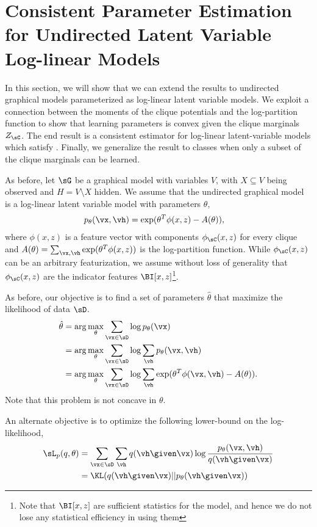 \section{Consistent Parameter Estimation for Undirected Latent Variable Log-linear Models}
\label{sec:undirected}

In this section, we will show that we can extend the results to
  undirected graphical models parameterized as log-linear latent variable
  models.
We exploit a connection between the moments of the clique potentials and
  the log-partition function to show that learning parameters is convex
  given the clique marginals $Z_\sC$. 
The end result is a consistent estimator for log-linear
  latent-variable models which satisfy .
Finally, we generalize the result to classes when only a subset of the
  clique marginals can be learned.

As before, let $\sG$ be a graphical model with variables $V$, with $X
  \subseteq V$ being observed and $H = V \setminus X$ hidden.
We assume that the undirected graphical model is a log-linear latent
  variable model with parameters $\theta$,
\begin{align*}
  p_\theta(\vx, \vh) &= \exp( \theta^T\phi(x,z) - A(\theta) ),
\end{align*}
where $\phi(x,z)$ is a feature vector with components $\phi_\sC(x,z)$
  for every clique and $A(\theta) = \sum_{\vx, \vh}  \exp(
  \theta^T\phi(x,z) )$ is the log-partition function.
While $\phi_\sC(x,z)$ can be an arbitrary featurization, we assume
  without loss of generality that $\phi_\sC(x,z)$ are the indicator
  features $\BI[x,z]$\footnote{Note that $\BI[x,z]$ are sufficient
  statistics for the model, and hence we do not lose any statistical
  efficiency in using them}.

As before, our objective is to find a set of parameters $\hat \theta$
  that maximize the likelihood of data $\sD$.
\begin{align}
  \hat \theta 
      &= \arg\max_{\theta} \sum_{\vx \in \sD} \log p_\theta(\vx) \nonumber \\
      &= \arg\max_{\theta} \sum_{\vx \in \sD} \log \sum_{\vh} p_\theta(\vx,\vh) \nonumber \\
      &= \arg\max_{\theta} \sum_{\vx \in \sD} \log \sum_{\vh} \exp( \theta^T\phi(\vx,\vh) - A(\theta) ). \label{eqn:obj-ml}
\end{align}
Note that this problem is not concave in $\theta$. 

An alternate objective is to optimize the following lower-bound on the log-likelihood, 
\begin{align}
  \sL_p(q,\theta) &= \sum_{\vx \in \sD} \sum_{\vh} q(\vh \given \vx) \log\frac{p_\theta(\vx,\vh)}{q(\vh \given \vx)} \\
    &= \KL( q(\vh \given \vx) || p_{\theta}(\vh \given \vx)) \label{eqn:obj-kl}
\end{align}

